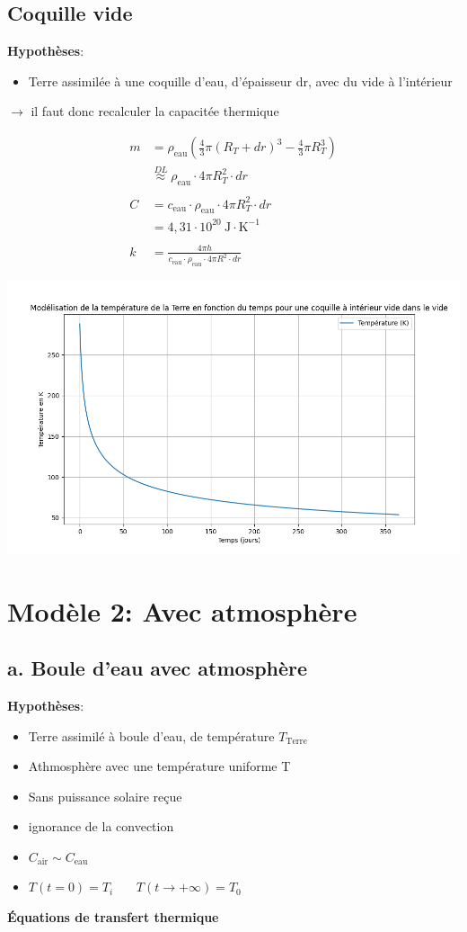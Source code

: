 \documentclass[a4paper,12pt]{article}
\begin{document}
\subsection{Coquille vide }
\textbf{Hypothèses}:
\begin{itemize}
    \item Terre assimilée à une coquille d'eau, d'épaisseur dr, avec du vide à l'intérieur
    
\end{itemize}
$\rightarrow$ il faut donc recalculer la capacitée thermique 


\begin{align*}
m &= \rho_{\text{eau}} \left( \frac{4}{3} \pi (R_T + dr)^3 - \frac{4}{3} \pi R_T^3 \right) \\
&\overset{DL}{\approx} \rho_{\text{eau}} \cdot 4\pi R_T^2 \cdot dr \\
\\
C &= c_{\text{eau}} \cdot \rho_{\text{eau}} \cdot 4\pi R_T^2 \cdot dr \\
&= 4{,}31 \cdot 10^{20} \ \text{J} \cdot \text{K}^{-1} \\
\\
k &= \frac{4\pi h }{c_{\text{eau}} \cdot \rho_{\text{eau}} \cdot 4\pi R^2 \cdot dr}
\end{align*}

    \includegraphics[width=0.8\linewidth]{../modele1/figures/modele1_coquille.png} 


\section{Modèle 2: Avec atmosphère}
\subsection{a. Boule d'eau avec atmosphère }
\textbf{Hypothèses}:
\begin{itemize}
    \item Terre assimilé à boule d'eau, de température \(T_{\text{Terre}}\) 
    \item  Athmosphère avec une température uniforme T 
    \item  Sans puissance solaire reçue  
    \item  ignorance de la convection  
    \item \(C_{\text{air}}\sim C_{\text{eau}}\) 
    \item $T(t=0) = T_i$ \ \ \
$T(t \to +\infty) = T_0$
   
\end{itemize}
\textbf{Équations de transfert thermique}
\end{document}

